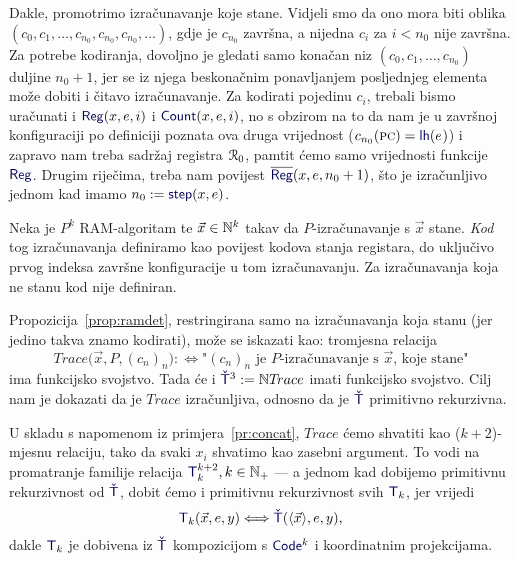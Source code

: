 Dakle, promotrimo izračunavanje koje stane. Vidjeli smo da ono mora biti oblika $(c_0,c_1,\dotsc,c_{n_0},c_{n_0},c_{n_0},\dotsc)$, gdje je $c_{n_0}$ završna, a nijedna $c_i$ za $i<n_0$ nije završna. Za potrebe kodiranja, dovoljno je gledati samo konačan niz $(c_0,c_1,\dotsc,c_{n_0})$ duljine $n_0+1$, jer se iz njega beskonačnim ponavljanjem posljednjeg elementa može dobiti i čitavo izračunavanje. Za kodirati pojedinu $c_i$, trebali bismo uračunati i $\f{Reg}(x,e,i)$ i $\f{Count}(x,e,i)$, no s obzirom na to da nam je u završnoj konfiguraciji po definiciji poznata ova druga vrijednost ($c_{n_0}(\textsc{pc})=\f{lh}(e\mspace{1mu})$) i zapravo nam treba sadržaj registra $\mathcal R_{0}$, pamtit ćemo samo vrijednosti funkcije $\f{Reg}$. Drugim riječima, treba nam povijest $\overline{\f{Reg}}(x,e,n_0+1)$, što je izračunljivo jednom kad imamo $n_0:=\f{step}(x,e)$.

\begin{definicija}[{name=[kod izračunavanja]}]\label{def:kodizr}
Neka je $P^k$ RAM-algoritam te $\vec x\in{\mathbb N}^k$ takav da $P$-izračunavanje s $\vec x$ stane. \emph{Kod} tog izračunavanja definiramo kao povijest kodova stanja registara, do uključivo prvog indeksa završne konfiguracije u tom izračunavanju. Za izračunavanja koja ne stanu kod nije definiran.
\end{definicija}

Propozicija~\ref{prop:ramdet}, restringirana samo na izračunavanja koja stanu (jer jedino takva znamo kodirati), može se iskazati kao: tromjesna relacija \begin{equation}\label{eq:Trace}
    T\!race\bigl(\vec x,P,(c_n)_n\bigr):\Longleftrightarrow\text{"$(c_n)_n$ je $P$-izračunavanje s $\vec x$, koje stane"}
\end{equation}
ima funkcijsko svojstvo. Tada će i $\f{\check T}^3:=\N T\!race$ imati funkcijsko svojstvo. Cilj nam je dokazati da je $T\!race$ izračunljiva, odnosno da je $\f{\check T}$ primitivno rekurzivna.

U skladu s napomenom iz primjera~\ref{pr:concat}, $T\!race$ ćemo shvatiti kao ($k+2$)-mjesnu relaciju, tako da svaki $x_i$ shvatimo kao zasebni argument. To vodi na promatranje familije relacija $\f T_k^{k+2},k\in\N_+$ --- a jednom kad dobijemo primitivnu rekurzivnost od $\f{\check T}$, dobit ćemo i primitivnu rekurzivnost svih $\f T_k$, jer vrijedi
\begin{equation}\label{eq:TkviadotT}
\f T_k(\vec x,e,y)\Longleftrightarrow\f{\check T}(\langle\vec x\rangle,e,y)\text,
\end{equation}
dakle $\f T_k$ je dobivena iz $\f{\check T}$ kompozicijom s $\f{Code}^k$ i koordinatnim projekcijama.

